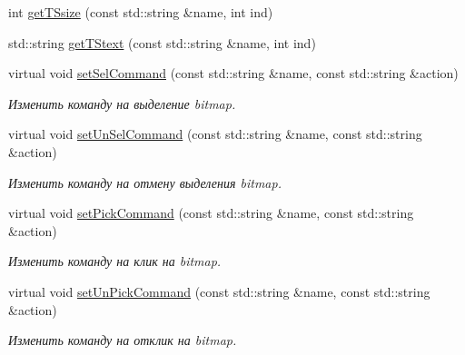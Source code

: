 \begin{DoxyCompactItemize}
\item 
int \hyperlink{class_interface_element_class_ac7b96d7196906f80b377e293cc36404c}{get\+T\+Ssize} (const std\+::string \&name, int ind)
\item 
std\+::string \hyperlink{class_interface_element_class_aef459140ce6fc4cfcf0b6fd017e73617}{get\+T\+Stext} (const std\+::string \&name, int ind)
\item 
virtual void \hyperlink{class_interface_element_class_a0e55bb0f0037715b19c29ce05a57abdc}{set\+Sel\+Command} (const std\+::string \&name, const std\+::string \&action)
\begin{DoxyCompactList}\small\item\em Изменить команду на выделение bitmap. \end{DoxyCompactList}\item 
virtual void \hyperlink{class_interface_element_class_ac327534caba198bf3347e1513cfe8491}{set\+Un\+Sel\+Command} (const std\+::string \&name, const std\+::string \&action)
\begin{DoxyCompactList}\small\item\em Изменить команду на отмену выделения bitmap. \end{DoxyCompactList}\item 
virtual void \hyperlink{class_interface_element_class_a866babb9cc309763567529771467fb76}{set\+Pick\+Command} (const std\+::string \&name, const std\+::string \&action)
\begin{DoxyCompactList}\small\item\em Изменить команду на клик на bitmap. \end{DoxyCompactList}\item 
virtual void \hyperlink{class_interface_element_class_a3823d61803f374b60458c9e8a7ff1505}{set\+Un\+Pick\+Command} (const std\+::string \&name, const std\+::string \&action)
\begin{DoxyCompactList}\small\item\em Изменить команду на отклик на bitmap. \end{DoxyCompactList}\end{DoxyCompactItemize}
